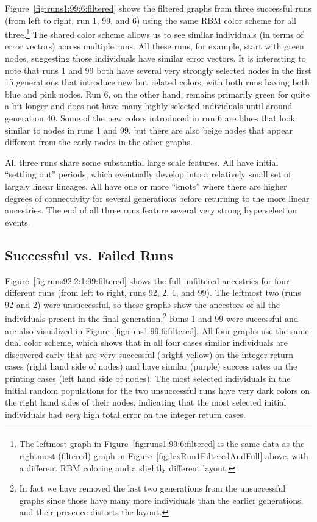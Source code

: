 \documentclass{sig-alternate}
\begin{document}
Figure~\ref{fig:runs1:99:6:filtered} shows the filtered graphs from three successful 
runs (from left to right, run 1, 99, and 6) using the same RBM color scheme for all three.\footnote{The leftmost graph in
Figure~\ref{fig:runs1:99:6:filtered} is the same data as the rightmost (filtered)
graph in Figure~\ref{fig:lexRun1FilteredAndFull} above, with a different RBM coloring
and a slightly different layout.} 
The shared color scheme allows us to see similar individuals (in terms of error vectors)
across multiple runs. All these runs, for example, start with green nodes, suggesting
those individuals have similar error vectors. It is interesting to note that runs 1 and 99
both have several very strongly selected nodes in the first 15 generations
that introduce new but related colors, with both runs having both blue and pink nodes.
Run 6, on the other hand, remains primarily green for quite a bit longer
and does not have many highly selected individuals until around generation 40. Some of 
the new colors introduced in run 6 are blues that look similar to nodes in runs 1 and 99, 
but there are also beige nodes that appear different from the early nodes in
the other graphs.

All three runs share some substantial large scale features. All have initial ``settling out''
periods, which eventually develop into a relatively small set of largely linear lineages.
All have one or more ``knots'' where there are higher degrees of connectivity for several 
generations before returning to the more linear ancestries. The end of all three runs
feature several very strong hyperselection events.

\subsection{Successful vs. Failed Runs}

Figure~\ref{fig:runs92:2:1:99:filtered} shows the full unfiltered ancestries for four
different runs (from left to right, runs 92, 2, 1, and 99). The leftmost two (runs 92 and 2) 
were unsuccessful, so these graphs show the ancestors
of all the individuals present in the final generation.\footnote{In fact we have removed
the last two generations from the unsuccessful graphs since those have many more individuals
than the earlier generations, and their presence distorts the layout.} 
Runs 1 and 99 were successful and are also visualized in Figure~\ref{fig:runs1:99:6:filtered}. All
four graphs use the same dual color scheme, which shows that in all four cases similar
individuals are discovered early that are very successful (bright yellow) on the integer
return cases (right hand side of nodes) and have similar (purple) success rates on the
printing cases (left hand side of nodes). The most selected individuals in the initial
random populations for the two unsuccessful runs have very dark colors on the
right hand sides of their nodes, indicating that the most selected initial individuals
had \emph{very} high total error on the integer return cases.
\end{document}
